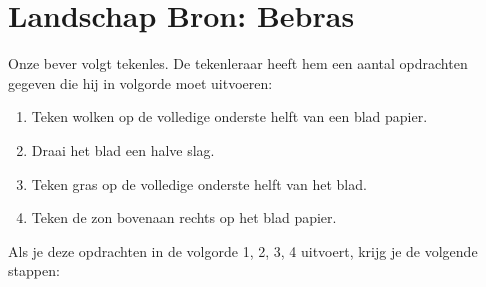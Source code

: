 \documentclass[12pt]{article}
\begin{document}
	
	\def\Arrow{{\scalebox{4}{$\Rightarrow$}}}
	\def\Image#1{\raisebox{-.5\height}{\texttt{[image: \#1]}}}
	
	\begin{minipage}{\textwidth}
		\section{Landschap \hfill\small Bron: Bebras}

			
			Onze bever volgt tekenles. De tekenleraar heeft hem een aantal opdrachten gegeven die hij in volgorde moet uitvoeren:
			\begin{enumerate}
				\item Teken wolken op de volledige onderste helft van een blad papier.
				\item Draai het blad een halve slag.
				\item Teken gras op de volledige onderste helft van het blad.
				\item Teken de zon bovenaan rechts op het blad papier.
			\end{enumerate}
			Als je deze opdrachten in de volgorde 1, 2, 3, 4 uitvoert, krijg je de volgende stappen:


\end{minipage}
\end{document}
